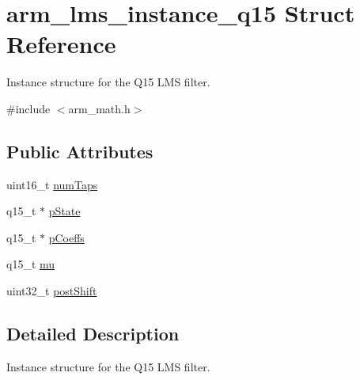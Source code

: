 \hypertarget{structarm__lms__instance__q15}{\section{arm\-\_\-lms\-\_\-instance\-\_\-q15 Struct Reference}
\label{structarm__lms__instance__q15}
}


Instance structure for the Q15 L\-M\-S filter.  




{\ttfamily \#include $<$arm\-\_\-math.\-h$>$}

\subsection*{Public Attributes}
\begin{DoxyCompactItemize}
\item 
uint16\-\_\-t \hyperlink{structarm__lms__instance__q15_a0078e894f805af1b360369e619fb57b3}{num\-Taps}
\item 
q15\-\_\-t $\ast$ \hyperlink{structarm__lms__instance__q15_a9a575ff82c1e68cbb583083439260d08}{p\-State}
\item 
q15\-\_\-t $\ast$ \hyperlink{structarm__lms__instance__q15_a42f95368b94898eb82608e1113d18cab}{p\-Coeffs}
\item 
q15\-\_\-t \hyperlink{structarm__lms__instance__q15_aae46129d7cfd7f1c162cc502ed0a9d49}{mu}
\item 
uint32\-\_\-t \hyperlink{structarm__lms__instance__q15_acca5fbaef4a52ae411de24c9a0b929cf}{post\-Shift}
\end{DoxyCompactItemize}


\subsection{Detailed Description}
Instance structure for the Q15 L\-M\-S filter. 

